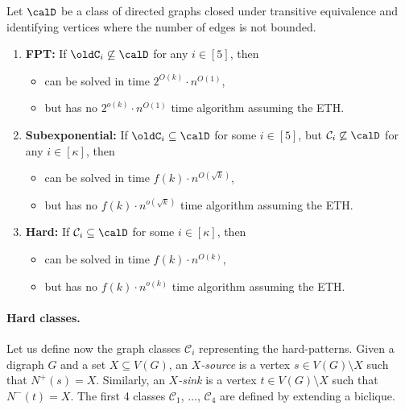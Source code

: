 \begin{mdframed}[style=highlight,frametitle={Our main result}] 
\begin{theorem}\label{thm:main-intro}
  Let $\calD$ be a class of directed graphs closed under transitive equivalence and identifying vertices where the number of edges is not bounded.
  \begin{enumerate}
  \item \textbf{FPT:}   If $\oldC_i\not\subseteq \calD$ for any $i\in [5]$, then \Dsnfull
    \begin{itemize}
    \item[(i)] can be solved in time $2^{O(k)}\cdot n^{O(1)}$,
    \item[(ii)] but has no $2^{o(k)}\cdot n^{O(1)}$ time algorithm assuming the ETH.
    \end{itemize}
  \item \textbf{Subexponential:}   If $\oldC_i\subseteq\calD$ for some $i\in [5]$, but $\mathcal{C}_i\not\subseteq \calD$ for any $i\in[\kappa]$, then \Dsnfull
    \begin{itemize}
    \item[(iii)] can be solved in time $f(k) \cdot n^{O(\sqrt{k})}$,
      \item[(iv)] but has no
        $f(k) \cdot n^{o(\sqrt{k})}$ time algorithm assuming the ETH.
      \end{itemize}
    \item \textbf{Hard:} If $\mathcal{C}_i\subseteq \calD$ for some $i\in [\kappa]$, then \Dsnfull
      \begin{itemize}
      \item[(v)]  can be solved in time $f(k)\cdot n^{O({k})}$,
        \item[(vi)] but has no $f(k) \cdot n^{o({k})}$ time algorithm assuming the ETH.
        \end{itemize}
      \end{enumerate}
    \end{theorem}
  \end{mdframed}

\paragraph{Hard classes.}
Let us define now the graph classes $\mathcal{C}_i$ representing the hard-patterns. Given a digraph $G$ and a set $X \subseteq V(G)$, an \emph{$X$-source} is a vertex $s \in V(G) \setminus X$ such that $N^+(s) = X$.
Similarly, an \emph{$X$-sink} is a vertex $t \in V(G) \setminus X$ such that $N^-(t) = X$.
The first 4 classes $\mathcal{C}_1$, $\dots$, $\mathcal{C}_4$ are defined by extending a biclique.

